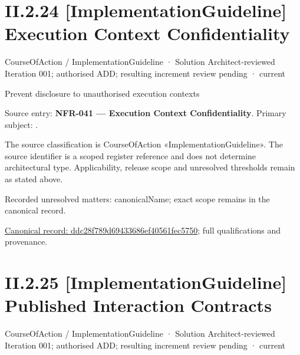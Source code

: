 \section*{II.2.24 [ImplementationGuideline] Execution Context Confidentiality}
\label{navigation:II.2.24}

\label{element:ddc28f789d69433686ef40561fec5750}
{\small CourseOfAction / ImplementationGuideline · Solution Architect-reviewed Iteration 001; authorised ADD; resulting increment review pending · current}\par

Prevent disclosure to unauthorised execution contexts



Source entry: \textbf{NFR-041 — Execution Context Confidentiality}. Primary subject: \texttt{}.



The source classification is CourseOfAction «ImplementationGuideline». The source identifier is a scoped register reference and does not determine architectural type. Applicability, release scope and unresolved thresholds remain as stated above.


{\small Recorded unresolved matters: canonicalName; exact scope remains in the canonical record.}\par
{\footnotesize \href{../../../../continuum/strategy/course-of-action/implementation-guideline/ddc28f789d69433686ef40561fec5750.md}{Canonical record: ddc28f789d69433686ef40561fec5750}; full qualifications and provenance.}\par
\section*{II.2.25 [ImplementationGuideline] Published Interaction Contracts}
\label{navigation:II.2.25}

\label{element:b21633d8a1554688baf8704264c63608}
{\small CourseOfAction / ImplementationGuideline · Solution Architect-reviewed Iteration 001; authorised ADD; resulting increment review pending · current}\par

